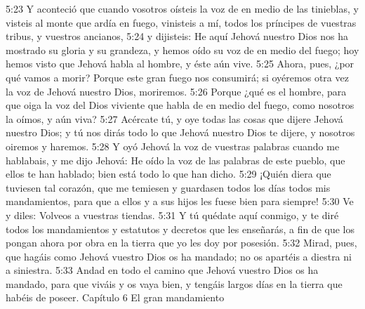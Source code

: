 5:23 Y aconteció que cuando vosotros oísteis la voz de en medio de las tinieblas, y visteis al monte que ardía en fuego, vinisteis a mí, todos los príncipes de vuestras tribus, y vuestros ancianos,  
5:24 y dijisteis: He aquí Jehová nuestro Dios nos ha mostrado su gloria y su grandeza, y hemos oído su voz de en medio del fuego; hoy hemos visto que Jehová habla al hombre, y éste aún vive.  
5:25 Ahora, pues, ¿por qué vamos a morir? Porque este gran fuego nos consumirá; si oyéremos otra vez la voz de Jehová nuestro Dios, moriremos.  
5:26 Porque ¿qué es el hombre, para que oiga la voz del Dios viviente que habla de en medio del fuego, como nosotros la oímos, y aún viva?  
5:27 Acércate tú, y oye todas las cosas que dijere Jehová nuestro Dios; y tú nos dirás todo lo que Jehová nuestro Dios te dijere, y nosotros oiremos y haremos.  
5:28 Y oyó Jehová la voz de vuestras palabras cuando me hablabais, y me dijo Jehová: He oído la voz de las palabras de este pueblo, que ellos te han hablado; bien está todo lo que han dicho.  
5:29 ¡Quién diera que tuviesen tal corazón, que me temiesen y guardasen todos los días todos mis mandamientos, para que a ellos y a sus hijos les fuese bien para siempre!  
5:30 Ve y diles: Volveos a vuestras tiendas.  
5:31 Y tú quédate aquí conmigo, y te diré todos los mandamientos y estatutos y decretos que les enseñarás, a fin de que los pongan ahora por obra en la tierra que yo les doy por posesión.  
5:32 Mirad, pues, que hagáis como Jehová vuestro Dios os ha mandado; no os apartéis a diestra ni a siniestra.  
5:33 Andad en todo el camino que Jehová vuestro Dios os ha mandado, para que viváis y os vaya bien, y tengáis largos días en la tierra que habéis de poseer.  
Capítulo 6 
El gran mandamiento  

